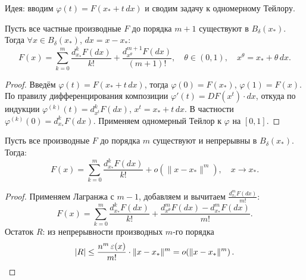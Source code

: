 

\begin{note}
Идея: вводим $\varphi(t) = F(x_* + t\,dx)$ и сводим задачу к одномерному Тейлору.
\end{note}

\begin{theorem}
Пусть все частные производные $F$ до порядка $m+1$ существуют в $B_\delta(x_*)$.
Тогда $\forall x \in B_\delta(x_*)$, $dx = x - x_*$:
\[
    F(x) = \sum_{k=0}^{m} \frac{d^k_{x_*} F(dx)}{k!}
    + \frac{d^{m+1}_{x^\theta} F(dx)}{(m+1)!},
    \quad \theta \in (0,1),
    \quad x^\theta = x_* + \theta\,dx.
\]
\end{theorem}

\begin{proof}
Введём $\varphi(t) = F(x_* + t\,dx)$, тогда $\varphi(0) = F(x_*)$, $\varphi(1) = F(x)$.
По правилу дифференцирования композиции $\varphi'(t) = DF(x^t)\cdot dx$,
откуда по индукции $\varphi^{(k)}(t) = d^k_{x^t}F(dx)$, $x^t = x_*+t\,dx$.
В частности $\varphi^{(k)}(0) = d^k_{x_*}F(dx)$.
Применяем одномерный Тейлор к $\varphi$ на $[0,1]$. \qedhere
\end{proof}

\begin{theorem}
Пусть все производные $F$ до порядка $m$ существуют и непрерывны в $B_\delta(x_*)$.
Тогда:
\[
    F(x) = \sum_{k=0}^{m} \frac{d^k_{x_*} F(dx)}{k!}
    + o\!\left(\|x - x_*\|^m\right), \quad x \to x_*.
\]
\end{theorem}

\begin{proof}
Применяем Лагранжа с $m-1$, добавляем и вычитаем $\frac{d^m_{x_*}F(dx)}{m!}$:
\[
    F(x) = \sum_{k=0}^{m} \frac{d^k_{x_*} F(dx)}{k!}
    + \frac{d^m_{x^\theta}F(dx) - d^m_{x_*}F(dx)}{m!}.
\]
Остаток $R$: из непрерывности производных $m$-го порядка
\[
    |R| \leq \frac{n^m\,\varepsilon(x)}{m!}\cdot\|x-x_*\|^m = o\!\left(\|x-x_*\|^m\right). \qedhere
\]
\end{proof}


